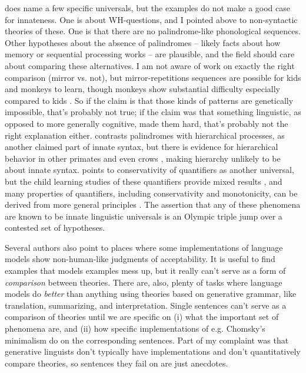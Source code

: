 \documentclass[output=paper,colorlinks,citecolor=brown]{langscibook}
\begin{document}
\largerpage
\citet{katzir2023large} does name a few specific universals, but the examples do not make a good case for innateness. One is about WH-questions, and I pointed above to non-syntactic theories of these. One is that there are no palindrome-like phonological sequences. Other hypotheses about the absence of palindromes -- likely facts about how memory or sequential processing works -- are plausible, and the field should care about comparing these alternatives. I am not aware of work on exactly the right comparison (mirror vs. not), but mirror-repetitions sequences are possible for kids and monkeys to learn, though monkeys show substantial difficulty especially compared to kids \citep{jiang2018production}. So if the claim is that those kinds of patterns are genetically impossible, that's probably not true; if the claim was that something linguistic, as opposed to more generally cognitive, made them hard, that's probably not the right explanation either. \citet{katzir2023large} contrasts palindromes with hierarchical processes, as another claimed part of innate syntax, but there is evidence for hierarchical behavior in other primates \citep{ferrigno2020recursive,voloh2023hierarchical} and even crows \citep{liao2022recursive}, making hierarchy unlikely to be about innate syntax. \citet{katzir2023large} points to conservativity of quantifiers as another universal, but the child learning studies of these quantifiers provide mixed results \citep{spenader2019conservative}, and many properties of quantifiers, including conservativity and monotonicity, can be derived from more general principles \citep{steinert2019learnability,carcassi2021monotone,van2021quantifiers,steinert2021quantifiers}.
The assertion that any of these phenomena are known to be innate linguistic universals is an Olympic triple jump over a contested set of hypotheses. 

Several authors also point to places where some implementations of language models show non-human-like judgments of acceptability. It is useful to find examples that models examples mess up, but it really can't serve as a form of \textit{comparison} between theories. There are, also, plenty of tasks where language models do \textit{better} than anything using theories based on generative grammar, like translation, summarizing, and interpretation. Single sentences can't serve as a comparison of theories until we are specific on (i) what the important set of phenomena are, and (ii) how specific implementations of e.g. Chomsky's minimalism do on the corresponding sentences. Part of my complaint was that generative linguists don't typically have implementations and don't quantitatively compare theories, so sentences they fail on are just anecdotes.
\end{document}
